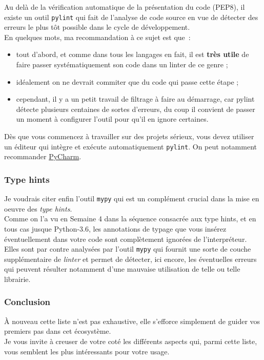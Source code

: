     Au delà de la vérification automatique de la présentation du code
(PEP8), il existe un outil \texttt{pylint} qui fait de l'analyse de code
source en vue de détecter des erreurs le plus tôt possible dans le cycle
de développement.\\

En quelques mots, ma recommandation à ce sujet est que~:

\begin{itemize}
\tightlist
\item
  tout d'abord, et comme dans tous les langages en fait, il est
  \textbf{très utile} de faire passer systématiquement son code dans un
  linter de ce genre ;
\item
  idéalement on ne devrait commiter que du code qui passe cette étape ;
\item
  cependant, il y a un petit travail de filtrage à faire au démarrage,
  car pylint détecte plusieurs centaines de sortes d'erreurs, du coup il
  convient de passer un moment à configurer l'outil pour qu'il en ignore
  certaines.
\end{itemize}

    Dès que vous commencez à travailler sur des projets sérieux, vous devez
utiliser un éditeur qui intègre et exécute automatiquement
\texttt{pylint}. On peut notamment recommander
\href{https://www.jetbrains.com/pycharm/}{PyCharm}.

    \hypertarget{type-hints}{%
\subsubsection{Type hints}\label{type-hints}}

    Je voudrais citer enfin l'outil \texttt{mypy} qui est un complément
crucial dans la mise en oeuvre des \emph{type hints}.\\

Comme on l'a vu en Semaine 4 dans la séquence consacrée aux type hints,
et en tous cas jusque Python-3.6, les annotations de typage que vous
insérez éventuellement dans votre code sont complètement ignorées de
l'interpréteur.\\

Elles sont par contre analysées par l'outil \texttt{mypy} qui fournit
une sorte de couche supplémentaire de \emph{linter} et permet de
détecter, ici encore, les éventuelles erreurs qui peuvent résulter
notamment d'une mauvaise utilisation de telle ou telle librairie.

    \hypertarget{conclusion}{%
\subsubsection{Conclusion}\label{conclusion}}

    À nouveau cette liste n'est pas exhaustive, elle s'efforce simplement de
guider vos premiers pas dans cet écosystème.\\

Je vous invite à creuser de votre coté les différents aspects qui, parmi
cette liste, vous semblent les plus intéressants pour votre usage.